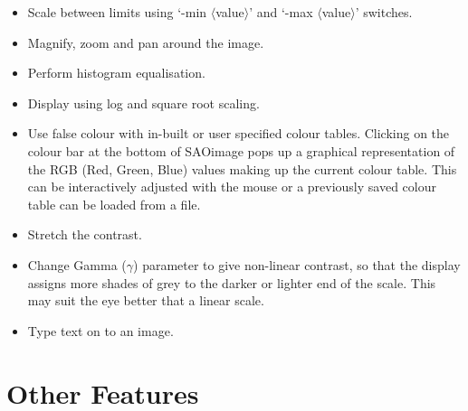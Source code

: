\begin{itemize}

\item{Scale between limits using `-min $\langle$value$\rangle$' and
`-max $\langle$value$\rangle$' switches.}

\item{Magnify, zoom and pan around the image.}

\item{Perform histogram equalisation.}

\item{Display using log and square root scaling.}

\item{Use false colour with in-built or user specified colour tables.
Clicking on the colour bar at the bottom of SAOimage pops up a
graphical representation of the RGB (Red, Green, Blue) values making
up the current colour table. This can be interactively adjusted with
the mouse or a previously saved colour table can be loaded from a
file.}

\item{Stretch the contrast.}

\item{Change Gamma ($\gamma$) parameter to give non-linear contrast, so that
the display assigns more shades of grey to the darker or lighter end of
the scale. This may suit the eye better that a linear scale.}

\item{Type text on to an image.}

\end {itemize}

\section{Other Features}

